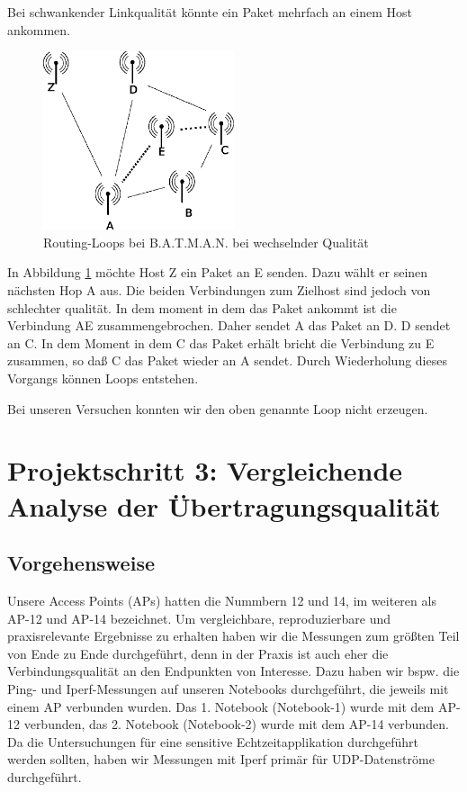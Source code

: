 \documentclass[a4paper,10pt]{article}
\begin{document}
Bei schwankender Linkqualität könnte ein Paket mehrfach an einem Host ankommen.

\begin{figure}[thb]
 \begin{center}
   \includegraphics[width=0.5\textwidth]{loop-routing.png}
    \caption{Routing-Loops bei B.A.T.M.A.N. bei wechselnder Qualität}
    \label{batman-loop-air}
  \end{center}
\end{figure}

In Abbildung \ref{batman-loop-air} möchte Host Z ein Paket an E senden. Dazu wählt er seinen nächsten Hop A aus.
Die beiden Verbindungen zum Zielhost sind jedoch von schlechter qualität.
In dem moment in dem das Paket ankommt ist die Verbindung AE zusammengebrochen.
Daher sendet A das Paket an D.
D sendet an C.
In dem Moment in dem C das Paket erhält bricht die Verbindung zu E zusammen, so daß C das Paket wieder an A sendet.
Durch Wiederholung dieses Vorgangs können Loops entstehen.

Bei unseren Versuchen konnten wir den oben genannte Loop nicht erzeugen.

\section{Projektschritt 3: Vergleichende Analyse der Übertragungsqualität}

\subsection{Vorgehensweise}

Unsere Access Points (APs) hatten die Nummbern 12 und 14, im weiteren als AP-12 und AP-14 bezeichnet.
Um vergleichbare, reproduzierbare und praxisrelevante Ergebnisse zu erhalten haben wir die Messungen zum größten Teil von Ende zu Ende durchgeführt, denn in der Praxis ist auch eher die Verbindungsqualität an den Endpunkten von Interesse.
Dazu haben wir bspw. die Ping- und Iperf-Messungen auf unseren Notebooks durchgeführt, die jeweils mit einem AP verbunden wurden.
Das 1. Notebook (Notebook-1) wurde mit dem AP-12 verbunden, das 2. Notebook (Notebook-2) wurde mit dem AP-14 verbunden.
Da die Untersuchungen für eine sensitive Echtzeitapplikation durchgeführt werden sollten, haben wir Messungen mit Iperf primär für UDP-Datenströme durchgeführt.
\end{document}
